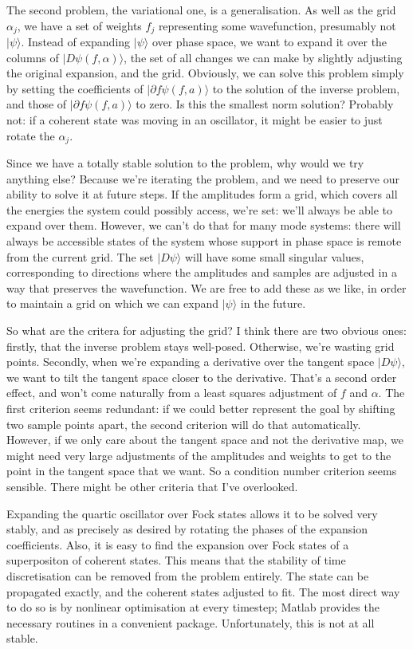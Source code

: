The second problem, the variational one, is a generalisation.  As well as the grid $α_j$, we have a set of weights $f_j$ representing some wavefunction, presumably not $|ψ\rangle$.  Instead of expanding $|ψ\rangle$ over phase space, we want to expand it over the columns of $|Dψ(f,α)\rangle$, the set of all changes we can make by slightly adjusting the original expansion, and the grid.  Obviously, we can solve this problem simply by setting the coefficients of $|∂fψ(f,a)\rangle$ to the solution of the inverse problem, and those of $|∂fψ(f,a)\rangle$ to zero.  Is this the smallest norm solution?  Probably not: if a coherent state was moving in an oscillator, it might be easier to just rotate the $α_j$.

Since we have a totally stable solution to the problem, why would we try anything else?  Because we're iterating the problem, and we need to preserve our ability to solve it at future steps.  If the amplitudes form a grid, which covers all the energies the system could possibly access, we're set: we'll always be able to expand over them.  However, we can't do that for many mode systems: there will always be accessible states of the system whose support in phase space is remote from the current grid.  The set $|Dψ\rangle$ will have some small singular values, corresponding to directions where the amplitudes and samples are adjusted in a way that preserves the wavefunction.  We are free to add these as we like, in order to maintain a grid on which we can expand $|ψ\rangle$ in the future.

So what are the critera for adjusting the grid?  I think there are two obvious ones: firstly, that the inverse problem stays well-posed.  Otherwise, we're wasting grid points.  Secondly, when we're expanding a derivative over the tangent space $|Dψ\rangle$, we want to tilt the tangent space closer to the derivative.  That's a second order effect, and won't come naturally from a least squares adjustment of $f$ and $α$.  The first criterion seems redundant: if we could better represent the goal by shifting two sample points apart, the second criterion will do that automatically.  However, if we only care about the tangent space and not the derivative map, we might need very large adjustments of the amplitudes and weights to get to the point in the tangent space that we want.  So a condition number criterion seems sensible.  There might be other criteria that I've overlooked.


Expanding the quartic oscillator over Fock states allows it to be solved very stably, and as precisely as desired by rotating the phases of the expansion coefficients.  Also, it is easy to find the expansion over Fock states of a superpositon of coherent states.  This means that the stability of time discretisation can be removed from the problem entirely.  The state can be propagated exactly, and the coherent states adjusted to fit.  The most direct way to do so is by nonlinear optimisation at every timestep; Matlab provides the necessary routines in a convenient package.  Unfortunately, this is not at all stable.  

